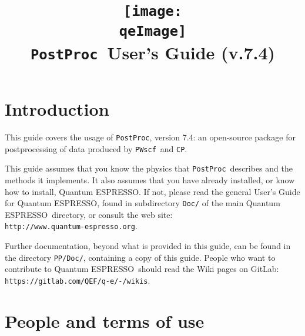 \documentclass[12pt,a4paper]{article}
\def\version{7.4}
\def\qe{{\sc Quantum ESPRESSO}}
\def\PWscf{\texttt{PWscf}}
\def\CP{\texttt{CP}}
\def\PostProc{\texttt{PostProc}}
\begin{document}
 
\author{}
\date{}

\def\qeImage{../../Doc/quantum_espresso}

\title{
  \texttt{[image: \\qeImage]} \\
  \Huge \PostProc\ User's Guide (v.\version) 
}

\maketitle

\tableofcontents

\section{Introduction}

This guide covers the usage of \PostProc, version \version: 
an open-source package for postprocessing of data produced by
\PWscf\ and \CP.

This guide assumes that you know the physics 
that \PostProc\ describes and the methods it implements.
It also assumes  that you have already installed,
or know how to install, \qe. If not, please read
the general User's Guide for \qe, found in 
subdirectory \texttt{Doc/} of the main \qe\ directory,
or consult the web site:\\
\texttt{http://www.quantum-espresso.org}.

Further documentation, beyond what is provided 
in this guide, can be found in the directory
\texttt{PP/Doc/}, containing a copy of this guide.
People who want to contribute to \qe\ should read the
Wiki pages on GitLab: \texttt{https://gitlab.com/QEF/q-e/-/wikis}.

\section{People and terms of use}
\end{document}
